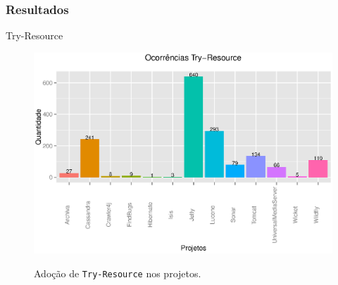 \documentclass[]{beamer}
\begin{document}
	\begin{frame}[fragile, label=re]\frametitle{Resultados}
		\begin{block}{Try-Resource}
	
			\begin{figure}[Th]
				\center
				\includegraphics[scale=0.39]{../TCC/Imagens/ocorrenciasTryResource}
				\label{fig:tryresource}
				\caption{Adoção de \texttt{Try-Resource} nos projetos.}
			\end{figure}
		\end{block}
	
	\end{frame}	
	
\end{document}

